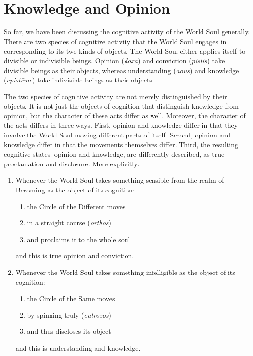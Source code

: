 
\section{Knowledge and Opinion} %
\label{sec:knowledge_and_opinion}

So far, we have been discussing the cognitive activity of the World Soul generally. There are two species of cognitive activity that the World Soul engages in corresponding to its two kinds of objects. The World Soul either applies itself to divisible or indivisible beings. Opinion (\emph{doxa}) and conviction (\emph{pistis}) take divisible beings as their objects, whereas understanding (\emph{nous}) and knowledge (\emph{epistēme}) take indivisible beings as their objects. 

The two species of cognitive activity are not merely distinguished by their objects. It is not just the objects of cognition that distinguish knowledge from opinion, but the character of these acts differ as well. Moreover, the character of the acts differs in three ways. First, opinion and knowledge differ in that they involve the World Soul moving different parts of itself. Second, opinion and knowledge differ in that the movements themselves differ. Third, the resulting cognitive states, opinion and knowledge, are differently described, as true proclamation and disclosure. More explicitly:
\begin{enumerate}[(1)]
	\item Whenever the World Soul takes something sensible from the realm of Becoming as the object of its cognition:
	\begin{enumerate}
		\item the Circle of the Different moves
		\item in a straight course (\emph{orthos})
		\item and proclaims it to the whole soul
	\end{enumerate}
and this is true opinion and conviction.
	\item Whenever the World Soul takes something intelligible as the object of its cognition:
	\begin{enumerate}
		\item the Circle of the Same moves
		\item by spinning truly (\emph{eutroxos})
		\item and thus discloses its object
	\end{enumerate}
and this is understanding and knowledge.
\end{enumerate}

